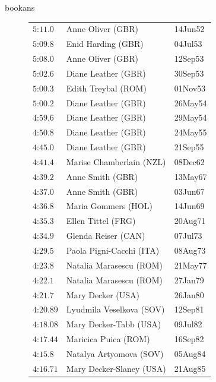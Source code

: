 \begin{exercises}
\begin{Filesave}{bookans}
\begin{figure}
{{\begin{tabular}[t]{|l|ll|}
           $\text{5:11}.0$    &Anne Oliver (GBR)           &14Jun52 \\
           $\text{5:09}.8$    &Enid Harding (GBR)          &04Jul53 \\
           $\text{5:08}.0$    &Anne Oliver (GBR)           &12Sep53 \\
           $\text{5:02}.6$    &Diane Leather (GBR)         &30Sep53 \\
           $\text{5:00}.3$    &Edith Treybal (ROM)         &01Nov53 \\
           $\text{5:00}.2$    &Diane Leather (GBR)         &26May54 \\
           $\text{4:59}.6$    &Diane Leather (GBR)         &29May54 \\
           $\text{4:50}.8$    &Diane Leather (GBR)         &24May55 \\
           $\text{4:45}.0$    &Diane Leather (GBR)         &21Sep55 \\
           $\text{4:41}.4$    &Marise Chamberlain (NZL)    &08Dec62 \\
           $\text{4:39}.2$    &Anne Smith (GBR)            &13May67 \\
           $\text{4:37}.0$    &Anne Smith (GBR)            &03Jun67 \\
           $\text{4:36}.8$    &Maria Gommers (HOL)         &14Jun69 \\
           $\text{4:35}.3$    &Ellen Tittel (FRG)          &20Aug71 \\
           $\text{4:34}.9$    &Glenda Reiser (CAN)         &07Jul73 \\
           $\text{4:29}.5$    &Paola Pigni-Cacchi (ITA)    &08Aug73 \\
           $\text{4:23}.8$    &Natalia Marasescu (ROM)     &21May77 \\
           $\text{4:22}.1$    &Natalia Marasescu (ROM)     &27Jan79 \\
           $\text{4:21}.7$    &Mary Decker (USA)           &26Jan80 \\
           $\text{4:20}.89$   &Lyudmila Veselkova (SOV)    &12Sep81 \\
           $\text{4:18}.08$   &Mary Decker-Tabb (USA)      &09Jul82 \\
           $\text{4:17}.44$   &Maricica Puica (ROM)        &16Sep82 \\
           $\text{4:15}.8$    &Natalya Artyomova (SOV)     &05Aug84 \\
           $\text{4:16}.71$   &Mary Decker-Slaney (USA)    &21Aug85 \\

\end{tabular}}}
\end{figure}
\end{Filesave}
\end{exercises}
